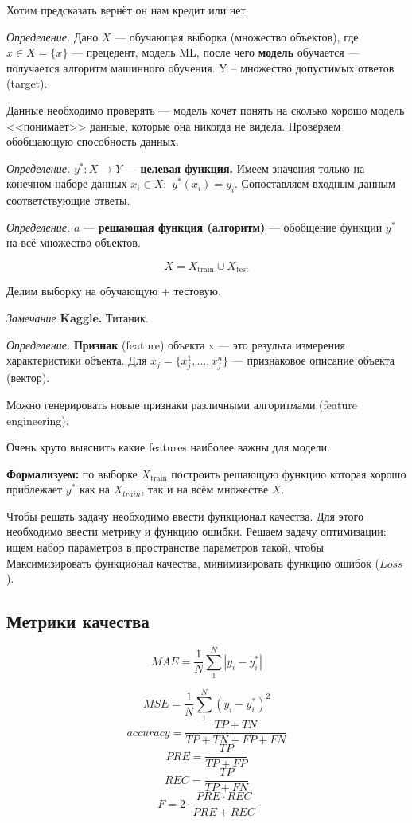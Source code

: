 \documentclass[a4paper,14pt]{article}
\begin{document}
Хотим предсказать вернёт он нам кредит или нет.

{\it Определение.} Дано $X$ --- обучающая выборка (множество объектов), где $x \in X = \{x\}$ --- прецедент, модель ML, после чего {\bf модель} обучается --- получается алгоритм машинного обучения. Y -- множество допустимых ответов (target).

Данные необходимо проверять --- модель хочет понять на сколько хорошо модель <<понимает>> данные, которые она никогда не видела. Проверяем обобщающую способность данных.

{\it Определение.} $y^{*}: X \rightarrow Y$ --- {\bf целевая функция.} Имеем значения только на конечном наборе данных $x_i \in X:$ $y^{*}(x_i) = y_i$. Сопоставляем входным данным соответствующие ответы.

{\it Определение.} $a$ --- {\bf решающая функция (алгоритм)} --- обобщение функции $y^{*}$ на всё множество объектов.

\[
    X = X_{\mathrm{train}} \cup X_{\mathrm{test}}
\]

Делим выборку на обучающую + тестовую.

{\it Замечание} {\bf Kaggle.} Титаник.

{\it Определение.} {\bf Признак } (feature) объекта x --- это результа измерения характеристики объекта. Для $x_j = \{x_j^{1}, \dots, x_j^{n}\}$ --- признаковое описание объекта (вектор).

Можно генерировать новые признаки различными алгоритмами (feature engineering).

Очень круто выяснить какие features наиболее важны для модели.

{\bf Формализуем:} по выборке $X_{\mathrm{train}}$ построить решающую функцию которая хорошо приблежает $y^{*}$ как на $X_{train}$, так и на всём множестве $X$.

Чтобы решать задачу необходимо ввести функционал качества. Для этого необходимо ввести метрику и функцию ошибки. Решаем задачу оптимизации: ищем набор параметров в пространстве параметров такой, чтобы Максимизировать функционал качества, минимизировать функцию ошибок ($Loss$).

\subsection{Метрики качества }
\[
    MAE = \frac{1}{N} \sum\limits_{1}^{N} | y_i - y_i^{*}|
\]

\[ 
    MSE = \frac{1}{N} \sum\limits_{1}^{N}  (y_i - y_i^{*})^2
\]
\[
    accuracy = \frac{TP + TN}{TP + TN + FP + FN}    
\]
\[
    PRE = \frac{TP }{TP + FP}    
\] 
\[
    REC = \frac{TP}{TP + FN}    
\]
\[
    F = 2 \cdot \frac{PRE \cdot REC}{PRE+REC}
\]
\end{document}
